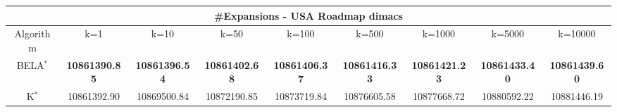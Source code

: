 \begin{tabular}{c|cccccccc}\toprule
\multicolumn{9}{c}{#Expansions - USA Roadmap dimacs}\\ \midrule
Algorithm & k=1 & k=10 & k=50 & k=100 & k=500 & k=1000 & k=5000 & k=10000 \\ \midrule
BELA$^*$ & \textbf{10861390.85} & \textbf{10861396.54} & \textbf{10861402.68} & \textbf{10861406.37} & \textbf{10861416.33} & \textbf{10861421.23} & \textbf{10861433.40} & \textbf{10861439.60} \\
K$^*$ & 10861392.90 & 10869500.84 & 10872190.85 & 10873719.84 & 10876605.58 & 10877668.72 & 10880592.22 & 10881446.19 \\ \bottomrule 
\end{tabular}
